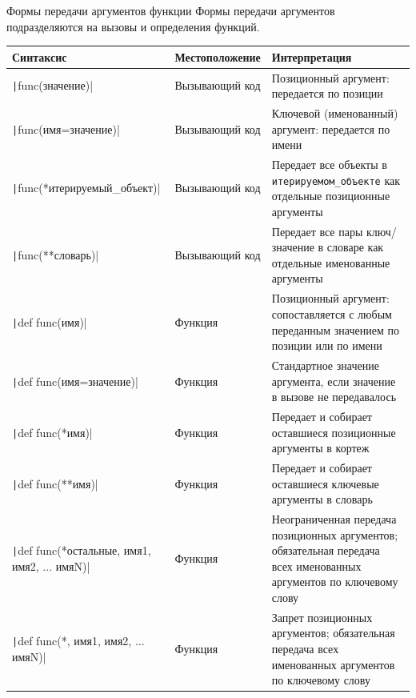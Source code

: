 \documentclass[aspectratio=169]{beamer}%
\begin{document}
\begin{frame}[fragile]{Формы передачи аргументов функции}
\scriptsize
Формы передачи аргументов подразделяются на вызовы и определения функций.
\begin{table}[h!]
\centering
\tiny
\begin{tabular}{|p{.35\linewidth}|p{.13\linewidth}|p{.45\linewidth}|}
\hline
\textbf{Синтаксис} & \textbf{Местоположение} & \textbf{Интерпретация} \\
\hline

\texttt|func(значение)| & Вызывающий код & Позиционный аргумент: передается по позиции \\

\texttt|func(имя=значение)| & Вызывающий код & Ключевой (именованный) аргумент: передается по имени \\

\texttt|func(*итерируемый_объект)| & Вызывающий код & Передает все объекты в \texttt{итерируемом\_объекте} как отдельные позиционные аргументы \\

\texttt|func(**словарь)| & Вызывающий код & Передает все пары ключ/значение в словаре как отдельные именованные аргументы \\

\texttt|def func(имя)| & Функция & Позиционный аргумент: сопоставляется с любым переданным значением по позиции или по имени \\

\texttt|def func(имя=значение)| & Функция & Стандартное значение аргумента, если значение в вызове не передавалось \\

\texttt|def func(*имя)| & Функция & Передает и собирает оставшиеся позиционные аргументы в кортеж \\

\texttt|def func(**имя)| & Функция & Передает и собирает оставшиеся ключевые аргументы в словарь \\

\texttt|def func(*остальные, имя1, имя2, ... имяN)|& Функция & Неограниченная передача позиционных аргументов; обязательная передача всех именованных аргументов по ключевому слову \\

\texttt|def func(*, имя1, имя2, ... имяN)|& Функция & Запрет позиционных аргументов; обязательная передача всех именованных аргументов по ключевому слову \\
\hline
\end{tabular}
\end{table}
\vfill
\end{frame}
\end{document}
